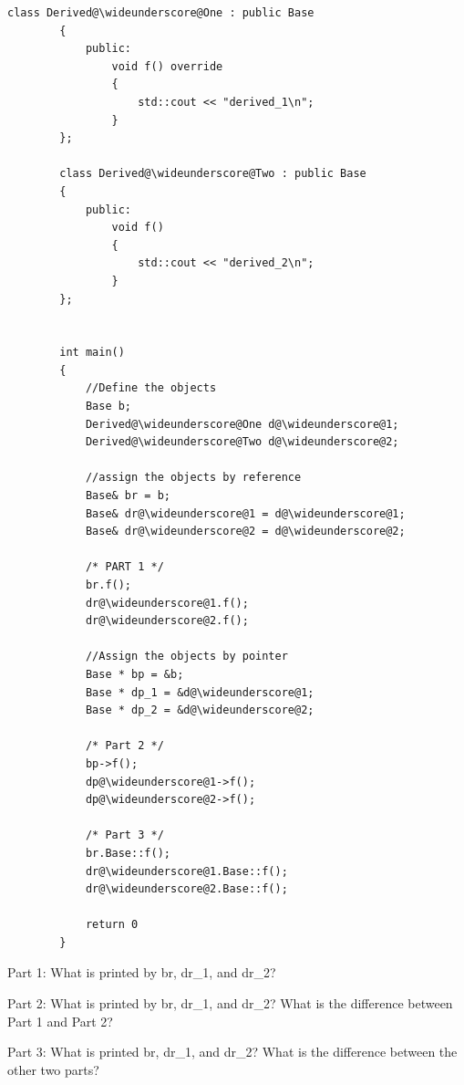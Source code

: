 \documentclass{article}
\begin{document}
\begin{enumerate}[label=(\alph*), itemsep = 120pt]
\begin{lstlisting}[style = CStyle]
        class Derived@\wideunderscore@One : public Base
        {
            public:
                void f() override
                {
                    std::cout << "derived_1\n";
                }
        };

        class Derived@\wideunderscore@Two : public Base 
        {
            public: 
                void f()
                {
                    std::cout << "derived_2\n";
                }
        };

    
        int main()
        {
            //Define the objects
            Base b;
            Derived@\wideunderscore@One d@\wideunderscore@1;
            Derived@\wideunderscore@Two d@\wideunderscore@2;

            //assign the objects by reference
            Base& br = b;
            Base& dr@\wideunderscore@1 = d@\wideunderscore@1;
            Base& dr@\wideunderscore@2 = d@\wideunderscore@2;

            /* PART 1 */
            br.f();
            dr@\wideunderscore@1.f();
            dr@\wideunderscore@2.f();

            //Assign the objects by pointer
            Base * bp = &b;
            Base * dp_1 = &d@\wideunderscore@1;
            Base * dp_2 = &d@\wideunderscore@2;

            /* Part 2 */
            bp->f();
            dp@\wideunderscore@1->f();
            dp@\wideunderscore@2->f();

            /* Part 3 */
            br.Base::f();
            dr@\wideunderscore@1.Base::f();
            dr@\wideunderscore@2.Base::f();

            return 0
        }
    \end{lstlisting}
    Part 1:
    What is printed by br, dr\_1, and dr\_2?

    \vspace{2cm}
    Part 2:
    What is printed by br, dr\_1, and dr\_2? What is the difference between Part 1 and Part 2?

    \vspace{2cm}
    Part 3:
    What is printed br, dr\_1, and dr\_2? What is the difference between the other two parts?
    \vspace{2cm}
    
    \end{enumerate}


    
\end{document}
